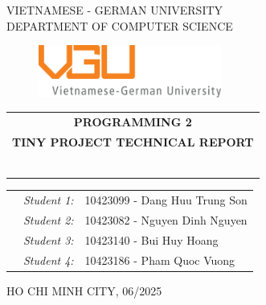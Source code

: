 \documentclass[11pt]{report}
\theoremstyle{mytheor}
\begin{document}
\begin{titlepage}
\begin{center}
VIETNAMESE - GERMAN UNIVERSITY \\
DEPARTMENT OF COMPUTER SCIENCE
\end{center}

\vspace{1cm}

\begin{figure}[h!]
\begin{center}
\includegraphics[width=6cm]{assets/vgu_logo_large.png}
\end{center}
\end{figure}

\vspace{2cm}

\begin{center}
\begin{tabular}{c}
\multicolumn{1}{c}{\textbf{{\Large PROGRAMMING 2}}} \\ 
\multicolumn{1}{c}{\textbf{{\Large TINY PROJECT TECHNICAL REPORT}}}

~~\\

\\
\multicolumn{1}{l}{\textbf{{\Large}}}\\
\\
\textbf{{\Large}}\\

\\
\\

\end{tabular}
\end{center}

\vspace{3cm}

\begin{table}[h]
\centering
\begin{tabular}{rrl}
&\textit{Student 1:} & 10423099 - Dang Huu Trung Son \\
&\textit{Student 2:} & 10423082 - Nguyen Dinh Nguyen \\
&\textit{Student 3:} & 10423140 - Bui Huy Hoang \\
&\textit{Student 4:} & 10423186 - Pham Quoc Vuong \\
\end{tabular}
\end{table}

\vspace{3cm}

\begin{center}
{\footnotesize HO CHI MINH CITY, 06/2025}
\end{center}

\end{titlepage}

\renewcommand{\contentsname}{Content}
\newpage
\vspace{1cm}
\tableofcontents

\newpage


\newpage


\newpage


\newpage


\newpage

\end{document}
